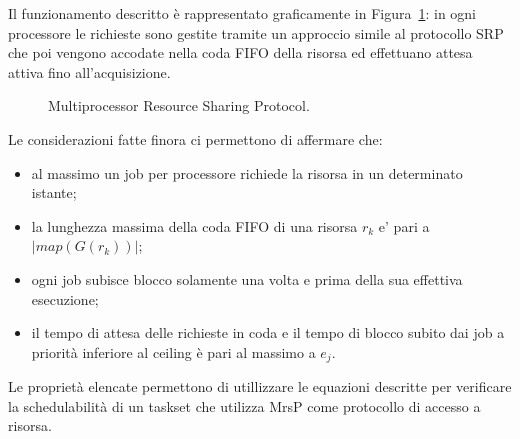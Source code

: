 Il funzionamento descritto è rappresentato graficamente in Figura~\ref{fig:locks.mrsp}: in ogni processore le richieste sono gestite tramite un approccio simile al protocollo SRP che poi vengono accodate nella coda FIFO della risorsa ed effettuano attesa attiva fino all'acquisizione.\\

\begin{figure}
\centering
{}
\caption{Multiprocessor Resource Sharing Protocol.}
\label{fig:locks.mrsp}
\end{figure}

Le considerazioni fatte finora ci permettono di affermare che:

\begin{itemize}
\item al massimo un job per processore richiede la risorsa in un determinato istante;
\item la lunghezza massima della coda FIFO di una risorsa $r_k$ e’ pari a $| map(G(r_k)) |$;
\item ogni job subisce blocco solamente una volta e prima della sua effettiva esecuzione;
\item il tempo di attesa delle richieste in coda e il tempo di blocco subito dai job a priorità inferiore al ceiling  è pari al massimo a $e_j$.
\end{itemize}

Le proprietà elencate permettono di utillizzare le equazioni descritte per verificare la schedulabilità di un taskset che utilizza MrsP come protocollo di accesso a risorsa.\\
